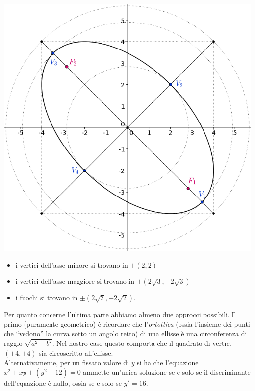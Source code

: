 \documentclass[a4paper,twoside]{article}
\theoremstyle{definition}
\numberwithin{theorem}{section}
\begin{document}
\begin{minipage}{0.4\textwidth}
\includegraphics[scale=1.2]{ellisse.png} 
\end{minipage}
\begin{minipage}{0.6\textwidth}
\begin{itemize}
 \item i vertici dell'asse minore si trovano in $\pm(2,2)$
 \item i vertici dell'asse maggiore si trovano in $\pm (2\sqrt{3},-2\sqrt{3})$
 \item i fuochi si trovano in $\pm(2\sqrt{2},-2\sqrt{2})$.
\end{itemize}

Per quanto concerne l'ultima parte abbiamo almeno due approcci possibili. Il primo (puramente geometrico) è ricordare che l'\emph{ortottica} (ossia l'insieme dei punti che ``vedono'' la curva sotto un angolo retto) di una ellisse è una circonferenza di raggio $\sqrt{a^2+b^2}$. Nel nostro caso questo comporta che il quadrato di vertici $(\pm 4,\pm 4)$ sia circoscritto all'ellisse.\\

Alternativamente, per un fissato valore di $y$ si ha che l'equazione $x^2+xy+(y^2-12)=0$ ammette un'unica soluzione se e solo se il discriminante dell'equazione è nullo, ossia se e solo se $y^2=16$.

\end{minipage}
\end{document}
